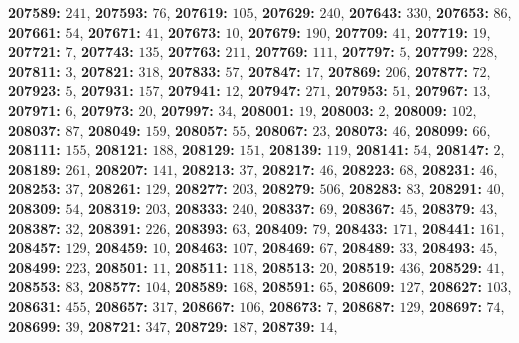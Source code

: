 \textsf{\bfseries 207589:} $241$, \textsf{\bfseries 207593:} $76$, \textsf{\bfseries 207619:} $105$, \textsf{\bfseries 207629:} $240$, \textsf{\bfseries 207643:} $330$, \textsf{\bfseries 207653:} $86$, \textsf{\bfseries 207661:} $54$, \textsf{\bfseries 207671:} $41$, \textsf{\bfseries 207673:} $10$, \textsf{\bfseries 207679:} $190$, \textsf{\bfseries 207709:} $41$, \textsf{\bfseries 207719:} $19$, \textsf{\bfseries 207721:} $7$, \textsf{\bfseries 207743:} $135$, \textsf{\bfseries 207763:} $211$, \textsf{\bfseries 207769:} $111$, \textsf{\bfseries 207797:} $5$, \textsf{\bfseries 207799:} $228$, \textsf{\bfseries 207811:} $3$, \textsf{\bfseries 207821:} $318$, \textsf{\bfseries 207833:} $57$, \textsf{\bfseries 207847:} $17$, \textsf{\bfseries 207869:} $206$, \textsf{\bfseries 207877:} $72$, \textsf{\bfseries 207923:} $5$, \textsf{\bfseries 207931:} $157$, \textsf{\bfseries 207941:} $12$, \textsf{\bfseries 207947:} $271$, \textsf{\bfseries 207953:} $51$, \textsf{\bfseries 207967:} $13$, \textsf{\bfseries 207971:} $6$, \textsf{\bfseries 207973:} $20$, \textsf{\bfseries 207997:} $34$, \textsf{\bfseries 208001:} $19$, \textsf{\bfseries 208003:} $2$, \textsf{\bfseries 208009:} $102$, \textsf{\bfseries 208037:} $87$, \textsf{\bfseries 208049:} $159$, \textsf{\bfseries 208057:} $55$, \textsf{\bfseries 208067:} $23$, \textsf{\bfseries 208073:} $46$, \textsf{\bfseries 208099:} $66$, \textsf{\bfseries 208111:} $155$, \textsf{\bfseries 208121:} $188$, \textsf{\bfseries 208129:} $151$, \textsf{\bfseries 208139:} $119$, \textsf{\bfseries 208141:} $54$, \textsf{\bfseries 208147:} $2$, \textsf{\bfseries 208189:} $261$, \textsf{\bfseries 208207:} $141$, \textsf{\bfseries 208213:} $37$, \textsf{\bfseries 208217:} $46$, \textsf{\bfseries 208223:} $68$, \textsf{\bfseries 208231:} $46$, \textsf{\bfseries 208253:} $37$, \textsf{\bfseries 208261:} $129$, \textsf{\bfseries 208277:} $203$, \textsf{\bfseries 208279:} $506$, \textsf{\bfseries 208283:} $83$, \textsf{\bfseries 208291:} $40$, \textsf{\bfseries 208309:} $54$, \textsf{\bfseries 208319:} $203$, \textsf{\bfseries 208333:} $240$, \textsf{\bfseries 208337:} $69$, \textsf{\bfseries 208367:} $45$, \textsf{\bfseries 208379:} $43$, \textsf{\bfseries 208387:} $32$, \textsf{\bfseries 208391:} $226$, \textsf{\bfseries 208393:} $63$, \textsf{\bfseries 208409:} $79$, \textsf{\bfseries 208433:} $171$, \textsf{\bfseries 208441:} $161$, \textsf{\bfseries 208457:} $129$, \textsf{\bfseries 208459:} $10$, \textsf{\bfseries 208463:} $107$, \textsf{\bfseries 208469:} $67$, \textsf{\bfseries 208489:} $33$, \textsf{\bfseries 208493:} $45$, \textsf{\bfseries 208499:} $223$, \textsf{\bfseries 208501:} $11$, \textsf{\bfseries 208511:} $118$, \textsf{\bfseries 208513:} $20$, \textsf{\bfseries 208519:} $436$, \textsf{\bfseries 208529:} $41$, \textsf{\bfseries 208553:} $83$, \textsf{\bfseries 208577:} $104$, \textsf{\bfseries 208589:} $168$, \textsf{\bfseries 208591:} $65$, \textsf{\bfseries 208609:} $127$, \textsf{\bfseries 208627:} $103$, \textsf{\bfseries 208631:} $455$, \textsf{\bfseries 208657:} $317$, \textsf{\bfseries 208667:} $106$, \textsf{\bfseries 208673:} $7$, \textsf{\bfseries 208687:} $129$, \textsf{\bfseries 208697:} $74$, \textsf{\bfseries 208699:} $39$, \textsf{\bfseries 208721:} $347$, \textsf{\bfseries 208729:} $187$, \textsf{\bfseries 208739:} $14$, 
